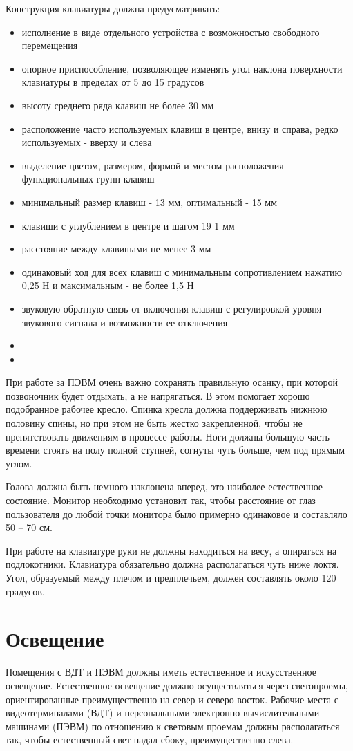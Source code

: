 \documentclass[12pt,a4paper]{report}
\begin{document}
Конструкция клавиатуры должна предусматривать: 
\begin{itemize}
\item исполнение в виде отдельного устройства с возможностью свободного перемещения
\item опорное приспособление, позволяющее изменять угол наклона поверхности клавиатуры в пределах от 5 до 15 градусов
\item высоту среднего ряда клавиш не более 30 мм
\item расположение часто используемых клавиш в центре, внизу и справа, редко используемых - вверху и слева
\item выделение цветом, размером, формой и местом расположения функциональных групп клавиш
\item минимальный размер клавиш - 13 мм, оптимальный - 15 мм
\item клавиши с углублением в центре и шагом 19  1 мм
\item расстояние между клавишами не менее 3 мм
\item одинаковый ход для всех клавиш с минимальным сопротивлением нажатию 0,25 Н и максимальным - не более 1,5 Н
\item звуковую обратную связь от включения клавиш с регулировкой уровня звукового сигнала и возможности ее отключения
\item 
\item 
\end{itemize}

При работе за ПЭВМ очень важно сохранять правильную осанку, при которой позвоночник будет отдыхать, а не напрягаться. В этом помогает хорошо подобранное рабочее кресло. Спинка кресла должна поддерживать нижнюю половину спины, но при этом не быть жестко закрепленной, чтобы не препятствовать движениям в процессе работы. Ноги должны большую часть времени стоять на полу полной ступней, согнуты чуть больше, чем под прямым углом. 

Голова должна быть немного наклонена вперед, это наиболее естественное состояние. Монитор необходимо установит так, чтобы расстояние от глаз пользователя до любой точки монитора было примерно одинаковое и составляло 50 – 70 см. 

При работе на клавиатуре руки не должны находиться на весу, а опираться на подлокотники. Клавиатура обязательно должна располагаться чуть ниже локтя. Угол, образуемый между плечом и предплечьем, должен составлять около 120 градусов. 

\section{Освещение}
Помещения с ВДТ и ПЭВМ должны иметь естественное и искусственное освещение. Естественное освещение должно осуществляться через светопроемы, ориентированные преимущественно на север и северо-восток. Рабочие места с видеотерминалами (ВДТ) и персональными электронно-вычислительными машинами (ПЭВМ) по отношению к световым проемам должны располагаться так, чтобы естественный свет падал сбоку, преимущественно слева.
\end{document}

